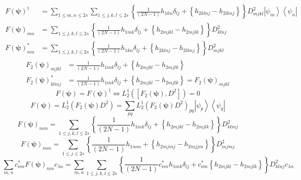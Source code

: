 \documentclass[aps,preprint]{revtex4}%
\begin{document}
\begin{align}
F\left(  \mathbf{\psi}\right)  ^{\dagger}  &  =\sum_{1\leq m,n\leq2s}%
\sum_{1\leq j,k,l\leq2s}\left\{  \frac{1}{\left(  2N-1\right)  }h_{1kn}%
\delta_{lj}+\overset{}{\left\{  h_{2klnj}-h_{2lknj}\right\}  }\right\}
D_{mjkl}^{2}\left\vert \psi_{m}\right\rangle \left\langle \psi_{n}\right\vert
\\
F\left(  \mathbf{\psi}\right)  _{mn}  &  =\sum_{1\leq j,k,l\leq2s}\left\{
\frac{1}{\left(  2N-1\right)  }h_{1mk}\delta_{lj}+\overset{}{\left\{
h_{2mjkl}-h_{2mjlk}\right\}  }\right\}  D_{klnj}^{2}\\
F\left(  \mathbf{\psi}\right)  _{nm}^{\ast}  &  =\sum_{1\leq j,k,l\leq
2s}\left\{  \frac{1}{\left(  2N-1\right)  }h_{1kn}\delta_{lj}+\overset
{}{\left\{  h_{2klnj}-h_{2lknj}\right\}  }\right\}  D_{mjkl}^{2}%
\end{align}%
\begin{align}
F_{2}\left(  \mathbf{\psi}\right)  _{mjkl}  &  =\frac{1}{\left(  2N-1\right)
}h_{1mk}\delta_{lj}+\overset{}{\left\{  h_{2mjkl}-h_{2mjlk}\right\}  }\\
F_{2}\left(  \mathbf{\psi}\right)  _{klmj}^{\ast}  &  =\frac{1}{\left(
2N-1\right)  }h_{1mk}\delta_{lj}+\overset{}{\left\{  h_{2mjkl}-h_{2mjlk}%
\right\}  =F_{2}\left(  \mathbf{\psi}\right)  _{mjkl}}%
\end{align}%
\begin{equation}
F\left(  \mathbf{\psi}\right)  =F\left(  \mathbf{\psi}\right)  ^{\dagger
}\Leftrightarrow L_{2}^{1}\left(  \left[  F_{2}\left(  \mathbf{\psi}\right)
,D^{2}\right]  \right)  =0
\end{equation}%
\begin{equation}
F\left(  \mathbf{\psi}\right)  =L_{2}^{1}\left(  F_{2}\left(  \mathbf{\psi
}\right)  D^{2}\right)  =\sum_{pq}L_{2}^{1}\left(  F_{2}\left(  \mathbf{\psi
}\right)  D^{2}\right)  _{pq}\left\vert \psi_{p}\right\rangle \left\langle
\psi_{q}\right\vert
\end{equation}%
\begin{equation}
F\left(  \mathbf{\psi}\right)  _{mm}=\sum_{1\leq j,k,l\leq2s}\left\{  \frac
{1}{\left(  2N-1\right)  }h_{1mk}\delta_{lj}+\overset{}{\left\{
h_{2mjkl}-h_{2mjlk}\right\}  }\right\}  D_{klmj}^{2}%
\end{equation}%
\begin{equation}
F\left(  \mathbf{\psi}\right)  _{mm}=\sum_{1\leq j\leq2s}\left\{  \frac
{1}{\left(  2N-1\right)  }h_{1mm}+\overset{}{\left\{  h_{2mjmj}-h_{2mjjm}%
\right\}  }\right\}  D_{mjmj}^{2}%
\end{equation}%
\begin{equation}
\sum_{m,n}c_{\nu m}^{\ast}F\left(  \mathbf{\psi}\right)  _{mn}c_{\lambda
n}=\sum_{m,n}\sum_{1\leq j,k,l\leq2s}\left\{  \frac{1}{\left(  2N-1\right)
}c_{\nu m}^{\ast}h_{1mk}\delta_{lj}+\overset{}{c_{\nu m}^{\ast}\left\{
h_{2mjkl}-h_{2mjlk}\right\}  }\right\}  D_{klnj}^{2}c_{\lambda n}%
\end{equation}
\end{document}
